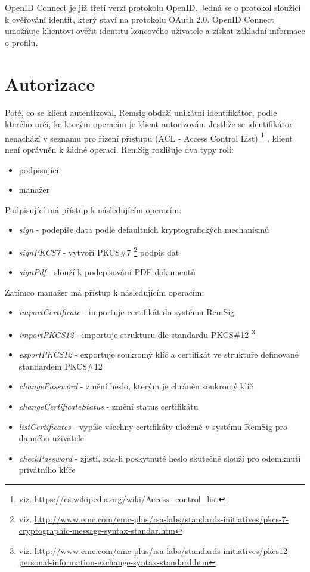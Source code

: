 \documentclass[]{fithesis3}
\begin{document}
		OpenID Connect je již třetí verzí protokolu OpenID. Jedná se o protokol sloužící k 					ověřování identit, který staví na protokolu OAuth 2.0.  OpenID Connect umožňuje 				klientovi ověřit identitu koncového uživatele a získat základní informace o profilu. 

	\section{Autorizace} 	

	Poté, co se klient autentizoval, Remsig obdrží unikátní identifikátor, podle kterého určí, ke 			kterým operacím je klient autorizován. Jestliže se identifikátor nenachází v seznamu pro řízení 		přístupu (ACL - Access Control List)
	\footnote{viz. \url{https://cs.wikipedia.org/wiki/Access_control_list}} , klient není oprávněn k 		žádné operaci. RemSig rozlišuje dva typy rolí:
	\begin{itemize}
		\item podpisující
		\item manažer
	\end{itemize}

	Podpisující má přístup k následujícím operacím:
	\begin{itemize}
		\item \textit{sign} - podepíše data podle defaultních kryptografických mechanismů
		\item \textit{signPKCS7} - vytvoří PKCS\#7
			\footnote{viz. \url{http://www.emc.com/emc-plus/rsa-labs/standards-initiatives/pkcs-7-cryptographic-message-syntax-standar.htm}} podpis dat
		\item \textit{signPdf} - slouží k podepisování PDF dokumentů
	\end{itemize}

	Zatímco manažer má přístup k následujícím operacím:
	\begin{itemize}
		\item \textit{importCertificate} - importuje certifikát do systému RemSig
		\item \textit{importPKCS12} - importuje strukturu dle standardu PKCS\#12
		\footnote{viz. \url{http://www.emc.com/emc-plus/rsa-labs/standards-initiatives/pkcs12-personal-information-exchange-syntax-standard.htm}}
		\item \textit{exportPKCS12} - exportuje soukromý klíč a certifikát ve struktuře 					definované standardem PKCS\#12
		\item \textit{changePassword} - změní heslo, kterým je chráněn soukromý klíč
		\item \textit{changeCertificateStatus} - změní status certifikátu
		\item \textit{listCertificates} - vypíše všechny certifikáty uložené v systému RemSig pro 			danného uživatele
		\item \textit{checkPassword} - zjistí, zda-li poskytnuté heslo skutečně slouží pro 					odemknutí privátního klíče
	\end{itemize}
\end{document}

